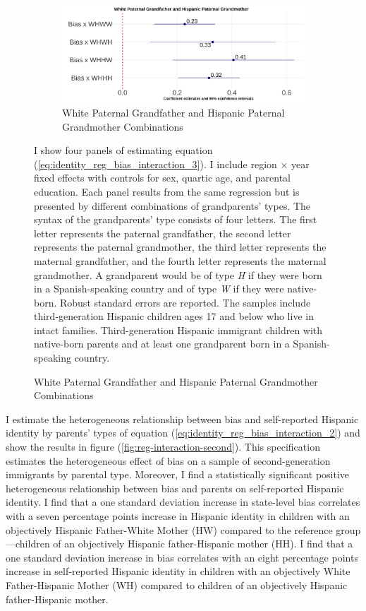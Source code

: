 \documentclass[12pt, fullpage]{article}
\newcommand{\note}[1]{\flushleft\footnotesize{#1}}
\begin{document}
\begin{figure}[H]
\begin{subfigure}{.48\textwidth}
\end{subfigure}
\begin{subfigure}{.48\textwidth}
\centering
\caption{White Paternal Grandfather and Hispanic Paternal Grandmother Combinations}
\label{fig:reg-interaction-third-d}
\includegraphics[width=.9\linewidth]{figure/skin-iat-regression-interaction-bygen-plot-WH.png}
\end{subfigure}
\flushleft\footnotesize{\note{I show four panels of estimating equation (\ref{eq:identity_reg_bias_interaction_3}). I include region $\times$ year fixed effects with controls for sex, quartic age, and parental education. Each panel results from the same regression but is presented by different combinations of grandparents' types. The syntax of the grandparents' type consists of four letters. The first letter represents the paternal grandfather, the second letter represents the paternal grandmother, the third letter represents the maternal grandfather, and the fourth letter represents the maternal grandmother. A grandparent would be of type \textit{H} if they were born in a Spanish-speaking country and of type \textit{W} if they were native-born. Robust standard errors are reported. The samples include third-generation Hispanic children ages 17 and below who live in intact families. Third-generation Hispanic immigrant children with native-born parents and at least one grandparent born in a Spanish-speaking country.}}
\end{figure}

I estimate the heterogeneous relationship between bias and self-reported Hispanic identity by parents' types of equation (\ref{eq:identity_reg_bias_interaction_2}) and show the results in figure (\ref{fig:reg-interaction-second}). This specification estimates the heterogeneous effect of bias on a sample of second-generation immigrants by parental type. Moreover, I find a statistically significant positive heterogeneous relationship between bias and parents on self-reported Hispanic identity. I find that a one standard deviation increase in state-level bias correlates with a seven percentage points increase in Hispanic identity in children with an objectively Hispanic Father-White Mother (HW) compared to the reference group---children of an objectively Hispanic father-Hispanic mother (HH). I find that a one standard deviation increase in bias correlates with an eight percentage points increase in self-reported Hispanic identity in children with an objectively White Father-Hispanic Mother (WH) compared to children of an objectively Hispanic father-Hispanic mother.
\end{document}
